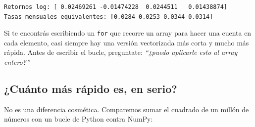 \documentclass[
  spanish,
  letterpaper,
  DIV=11,
  numbers=noendperiod]{scrreprt}
\begin{document}
\begin{verbatim}
Retornos log: [ 0.02469261 -0.01474228  0.0244511   0.01438874]
Tasas mensuales equivalentes: [0.0284 0.0253 0.0344 0.0314]
\end{verbatim}

\begin{tcolorbox}[enhanced jigsaw, bottomrule=.15mm, colback=white, opacitybacktitle=0.6, arc=.35mm, toprule=.15mm, opacityback=0, breakable, titlerule=0mm, left=2mm, coltitle=black, colbacktitle=quarto-callout-tip-color!10!white, colframe=quarto-callout-tip-color-frame, leftrule=.75mm, toptitle=1mm, bottomtitle=1mm, title=\textcolor{quarto-callout-tip-color}{\faLightbulb}\hspace{0.5em}{La regla de oro}, rightrule=.15mm]

Si te encontrás escribiendo un \texttt{for} que recorre un array para
hacer una cuenta en cada elemento, casi siempre hay una versión
vectorizada más corta y mucho más rápida. Antes de escribir el bucle,
preguntate: \emph{``¿puedo aplicarle esto al array entero?''}

\end{tcolorbox}

\subsection{¿Cuánto más rápido es, en
serio?}\label{cuuxe1nto-muxe1s-ruxe1pido-es-en-serio}

No es una diferencia cosmética. Comparemos sumar el cuadrado de un
millón de números con un bucle de Python contra NumPy:
\end{document}
